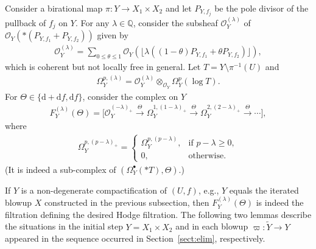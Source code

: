 \documentclass[pdftex]{sigma}
\newcommand{\QQ}{\mathbb{Q}}
\newcommand{\sO}{\mathscr{O}}
\newcommand{\de}{\mathrm{d}}
\newcommand{\ddRH}{\Theta}
\newcommand{\cpt}{compactification}
\newcommand{\flr}[1]{\lfloor #1 \rfloor}
\begin{document}
Consider a birational map $\pi\colon Y \to X_1\times X_2$ and let $P_{Y,f_j}$ be the pole divisor of the pullback of $f_j$ on $Y$. For any $\lambda\in\QQ$, consider the subsheaf $\sO_Y^{(\lambda)}$ of $\sO_Y(*(P_{Y,f_1}+P_{Y,f_2}))$ given by
\begin{gather*} \sO_Y^{(\lambda)} = \sum_{0\leq\theta\leq1} \sO_Y\left(\flr{\lambda((1-\theta) P_{Y,f_1} + \theta P_{Y,f_2})}\right), \end{gather*}
which is coherent but not locally free in general. Let $T = Y\setminus \pi^{-1}(U)$ and
\begin{gather*} \Omega_Y^{p,(\lambda)} = \sO_Y^{(\lambda)} \otimes_{\sO_Y} \Omega_Y^p(\log T). \end{gather*}
For $\ddRH \in \{\de +\de f, \de f\}$, consider the complex on $Y$
\begin{gather*} F_Y^{(\lambda)}(\Theta) = \big[ \sO_Y^{(-\lambda)_+} \xrightarrow{\ddRH} \Omega_Y^{1,(1-\lambda)_+}	\xrightarrow{\ddRH} \Omega_Y^{2,(2-\lambda)_+}	\xrightarrow{\ddRH} \cdots \big], \end{gather*}
where
\begin{gather*} \Omega_Y^{p,(p-\lambda)_+} = \begin{cases}
\Omega_Y^{p,(p-\lambda)}, & \text{if $p-\lambda \geq 0$}, \\
0 ,& \text{otherwise}. \end{cases} \end{gather*}
(It is indeed a sub-complex of $(\Omega_Y^\bullet(*T),\ddRH)$.)

If $Y$ is a non-degenerate {\cpt} of $(U,f)$, e.g., $Y$ equals the iterated blowup $X$ constructed in the previous subsection, then $F_Y^{(\lambda)}(\ddRH)$ is indeed the filtration defining the desired Hodge filtration.
The following two lemmas describe the situations in the initial step $Y = X_1\times X_2$ and in each blowup $\varpi\colon \widetilde{Y}\to Y$ appeared in the sequence occurred in Section~\ref{sect:elim}, respectively.
\end{document}
